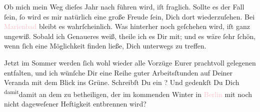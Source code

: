 \pstart
           Ob mich mein Weg dieſes Jahr nach \label{K_L03445-2v}\label{K_L03445-2h} führen wird, iſt fraglich. Sollte es der Fall ſein, ſo
               wird es mir natürlich eine große Freude ſein, Dich dort wiederzuſehen. {\pb}Bei \textcolor{pink}{Marienbad}{}\ledrightnote{\textcolor{pink}{Marienbad}}
               bleibt es wahrſcheinlich. Was hinterher noch geſchehen wird, iſt ganz ungewiß. Sobald
               ich Genaueres weiß, theile ich es Dir mit; und es wäre ſehr ſchön, wenn ſich eine
               Möglichkeit finden ließe, Dich unterwegs zu treffen.\pend
           
\pstart
           Jetzt im Sommer werden ſich wohl wieder alle Vorzüge Eurer prachtvoll gelegenen
                  \label{K_L03445-3v}\label{K_L03445-3h} entfalten, und ich wünſche Dir eine Reihe guter Arbeitsſtunden auf Deiner
               Veranda mit dem Blick ins {\pb}Grüne. Schreibſt Du ein
                  \label{K_L03445-4v}\label{K_L03445-4h}? Und gedenkſt
               Du Dich \substVorne{}\textsuperscript{damit}\substDazwischen{}damit\substHinten{} an dem \label{K_L03445-5v}\label{K_L03445-5h} zu betheiligen, der im kommenden Winter in \textcolor{pink}{Berlin}{}\ledrightnote{\textcolor{pink}{Berlin}} mit noch nicht dageweſener Heftigkeit entbrennen wird?\pend
           
